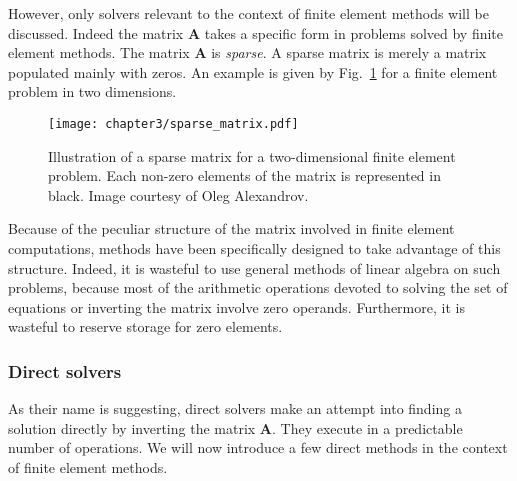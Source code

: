 However, only solvers relevant to the context of finite element methods will be discussed. Indeed the matrix $ \mathbf{A} $ takes a specific form in problems solved by finite element methods. The matrix $ \mathbf{A} $ is \emph{sparse}. A sparse matrix is merely a matrix populated mainly with zeros. An example is given by Fig.~\ref{chap3:fig-sparse} for a finite element problem in two dimensions.
\begin{figure}
\begin{center}
\texttt{[image: chapter3/sparse\_matrix.pdf]}
\end{center}
\caption{Illustration of a sparse matrix for a two-dimensional finite element problem. Each non-zero elements of the matrix is represented in black. Image courtesy of Oleg Alexandrov.}
\label{chap3:fig-sparse}
\end{figure}
Because of the peculiar structure of the matrix involved in finite element computations, methods have been specifically designed to take advantage of this structure. Indeed, it is wasteful to use general methods of linear algebra on such problems, because most of the arithmetic operations devoted to solving the set of equations or inverting the matrix involve zero operands. Furthermore, it is wasteful to reserve storage for zero elements. 

	
		\subsubsection*{Direct solvers}
As their name is suggesting, direct solvers make an attempt into finding a solution directly by inverting the matrix $ \mathbf{A} $. They execute in a predictable number of operations. We will now introduce a few direct methods in the context of finite element methods. 

